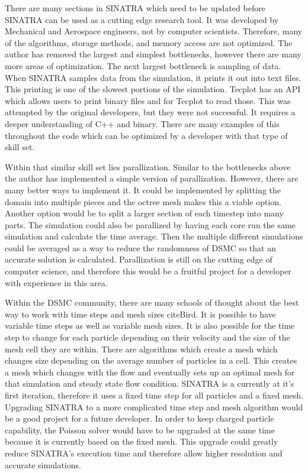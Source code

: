 There are many sections in SINATRA which need to be updated before SINATRA can be used as a cutting edge research tool. It was developed by Mechanical and Aerospace engineers, not by computer scientists. Therefore, many of the algorithms, storage methods, and memory access are not optimized. The author has removed the largest and simplest bottlenecks, however there are many more areas of optimization. The next largest bottleneck is sampling of data. When SINATRA samples data from the simulation, it prints it out into text files. This printing is one of the slowest portions of the simulation. Tecplot has an API which allows users to print binary files and for Tecplot to read those. This was attempted by the original developers, but they were not successful. It requires a deeper understanding of C++ and binary. There are many examples of this throughout the code which can be optimized by a developer with that type of skill set. \par

\indent Within that similar skill set lies parallization. Similar to the bottlenecks above the author has implemented a simple version of parallization. However, there are many better ways to implement it. It could be implemented by splitting the domain into multiple pieces and the octree mesh makes this a viable option. Another option would be to split a larger section of each timestep into many parts. The simulation could also be parallized by having each core run the same simulation and calculate the time average. Then the multiple different simulations could be averaged as a way to reduce the randomness of DSMC so that an accurate solution is calculated. Parallization is still on the cutting edge of computer science, and therefore this would be a fruitful project for a developer with experience in this area. \par

\indent Within the DSMC community, there are many schools of thought about the best way to work with time steps and mesh sizes cite{Bird}. It is possible to have variable time steps as well as variable mesh sizes. It is also possible for the time step to change for each particle depending on their velocity and the size of the mesh cell they are within. There are algorithms which create a mesh which changes size depending on the average number of particles in a cell. This creates a mesh which changes with the flow and eventually sets up an optimal mesh for that simulation and steady state flow condition. SINATRA is a currently at it's first iteration, therefore it uses a fixed time step for all particles and a fixed mesh. Upgrading SINATRA to a more complicated time step and mesh algorithm would be a good project for a future developer. In order to keep charged particle capability, the Poisson solver would have to be upgraded at the same time because it is currently based on the fixed mesh. This upgrade could greatly reduce SINATRA's execution time and therefore allow higher resolution and accurate simulations. \par

